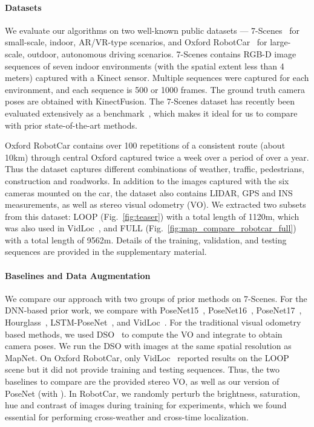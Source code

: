  
\paragraph{Datasets} We evaluate our algorithms on two well-known public datasets ---
7-Scenes~\cite{Shotton13Scene7} for small-scale, indoor, AR/VR-type
scenarios, and Oxford RobotCar~\cite{RobotCarDatasetIJRR} for
large-scale, outdoor, autonomous driving scenarios. 7-Scenes contains RGB-D image sequences of seven indoor
environments (with the spatial extent less than 4 meters) captured with a
Kinect sensor. Multiple sequences were captured for each environment, and each
sequence is 500 or 1000 frames. The ground truth camera poses are
obtained with KinectFusion. The 7-Scenes dataset has recently
been  evaluated extensively as a benchmark~\cite{Kendall15iccv, Kendall16icra,
Kendall17cvpr,
Melekhov17Hourglass,Walch17LSTM,Clark17VidLoc,Brachmann17RANSAC}, which makes
it ideal for us to compare with prior state-of-the-art methods.


Oxford RobotCar contains over 100 repetitions of a consistent route (about 10km)
through central Oxford captured twice a week over a period of over a year. Thus
the dataset captures different combinations of weather, traffic, pedestrians,
construction and roadworks. In addition to the images captured with the six
cameras mounted on the car, the dataset also contains LIDAR, GPS and INS
measurements, as well as stereo visual odometry (VO).
We extracted two subsets from this dataset: LOOP (Fig.~\ref{fig:teaser})
with a total length of 1120m, which was also used in VidLoc~\cite{Clark17VidLoc}, and
FULL (Fig.~\ref{fig:map_compare_robotcar_full}) with a total length
of 9562m. Details of the training, validation, and testing sequences are provided
in the supplementary material.

\vspace{-1em}
\paragraph{Baselines and Data Augmentation}

We compare our approach with two groups of prior methods on 7-Scenes. For the DNN-based
prior work, we compare with PoseNet15~\cite{Kendall15iccv},
PoseNet16~\cite{Kendall16icra}, PoseNet17~\cite{Kendall17cvpr},
Hourglass~\cite{Melekhov17Hourglass}, LSTM-PoseNet~\cite{Walch17LSTM}, and
VidLoc~\cite{Clark17VidLoc}.  For the traditional visual odometry based
methods, we used DSO~\cite{Engel2017DSO} to compute the VO and integrate to obtain camera poses. We run the DSO with images at the same spatial resolution as 
MapNet. On Oxford RobotCar, only VidLoc~\cite{Clark17VidLoc} reported
results on the LOOP scene but it did not provide training and
testing sequences. Thus, the two baselines to compare are 
the provided stereo VO, as well as our version of
PoseNet (with ). In RobotCar, we randomly perturb the brightness,
saturation, hue and contrast of images during training for experiments, which
we found essential for performing cross-weather and cross-time
localization. 




